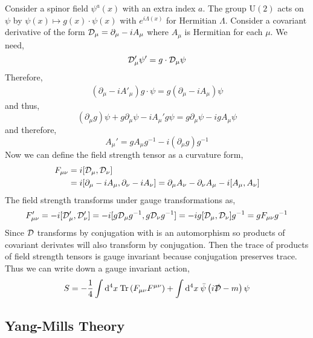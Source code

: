 \documentclass[12pt]{extarticle}
\begin{document}
Consider a spinor field $\psi^a(x)$ with an extra index $a$. The group $\mathrm{U}(2)$ acts on $\psi$ by $\psi(x) \mapsto g(x) \cdot \psi(x)$ with $e^{i \Lambda(x)}$ for Hermitian $\Lambda$. 
Consider a covariant derivative of the form $\mathcal{D}_\mu = \partial_\mu - i A_\mu$ where $A_\mu$ is Hermitian for each $\mu$. We need,
\[ \mathcal{D}_\mu' \psi' = g \cdot \mathcal{D}_\mu \psi \]
Therefore,
\begin{align*}
(\partial_\mu - i A'_\mu) g \cdot \psi = g (\partial_\mu - i A_\mu) \psi 
\end{align*} 
and thus,
\[ (\partial_\mu g) \psi + g \partial_\mu \psi - i A_\mu' g \psi = g \partial_{\mu} \psi - i g A_\mu \psi \]
and therefore,
\[ A_\mu' = g A_\mu g^{-1} - i (\partial_\mu g) g^{-1} \]
Now we can define the field strength tensor as a curvature form,
\begin{align*} 
F_{\mu \nu} & = i [\mathcal{D}_\mu, \mathcal{D}_\nu] 
\\
& = i [\partial_\mu - i A_\mu, \partial_\nu - i A_\nu] = \partial_\mu A_\nu - \partial_\nu A_\mu - i [ A_\mu, A_\nu ] 
\end{align*}
The field strength transforms under gauge transformations as,
\begin{align*}
F_{\mu \nu}' = - i [ \mathcal{D}'_\mu, \mathcal{D}'_\nu] = -i [g \mathcal{D}_\mu g^{-1}, g \mathcal{D}_\nu g^{-1}] = - i g [ \mathcal{D}_\mu, \mathcal{D}_\nu ] g^{-1} = g F_{\mu \nu} g^{-1}
\end{align*}
Since $\mathcal{D}$ transforms by conjugation with is an automorphism so products of covariant derivates will also transform by conjugation. Then the trace of products of field strength tensors is gauge invariant because conjugation preserves trace. Thus we can write down a gauge invariant action,
\[ S = - \frac{1}{4} \int \mathrm{d}^{4} x \: \mathrm{Tr}\left( F_{\mu \nu} F^{\mu \nu} \right) + \int \mathrm{d}^{4} x \: \bar{\psi} \left( i \slashed{\mathcal{D}} - m \right) \psi \]

\subsection{Yang-Mills Theory}
\end{document}
